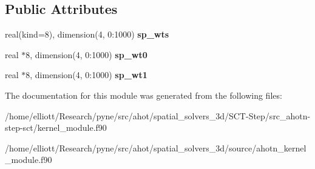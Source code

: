\subsection*{Public Attributes}
\begin{DoxyCompactItemize}
\item 
\hypertarget{classkernel__module_ad2a8647b9f46d5c36966764ba8084d64}{real(kind=8), dimension(4, 0\-:1000) {\bfseries sp\-\_\-wts}}\label{classkernel__module_ad2a8647b9f46d5c36966764ba8084d64}

\item 
\hypertarget{classkernel__module_a56176b696afbc435b81f6c7ebd75f287}{real $\ast$8, dimension(4, 0\-:1000) {\bfseries sp\-\_\-wt0}}\label{classkernel__module_a56176b696afbc435b81f6c7ebd75f287}

\item 
\hypertarget{classkernel__module_a9c85ae778290368b8125e6548542c20c}{real $\ast$8, dimension(4, 0\-:1000) {\bfseries sp\-\_\-wt1}}\label{classkernel__module_a9c85ae778290368b8125e6548542c20c}

\end{DoxyCompactItemize}


The documentation for this module was generated from the following files\-:\begin{DoxyCompactItemize}
\item 
/home/elliott/\-Research/pyne/src/ahot/spatial\-\_\-solvers\-\_\-3d/\-S\-C\-T-\/\-Step/src\-\_\-ahotn-\/step-\/sct/kernel\-\_\-module.\-f90\item 
/home/elliott/\-Research/pyne/src/ahot/spatial\-\_\-solvers\-\_\-3d/source/ahotn\-\_\-kernel\-\_\-module.\-f90\end{DoxyCompactItemize}
